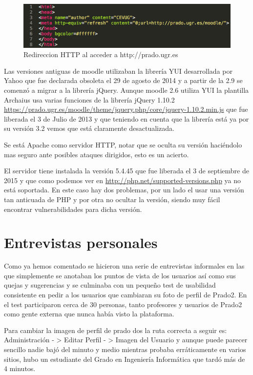\begin{figure}
\centering
\includegraphics[width=1.0\textwidth]{../screenshots/redireccionhttp}
\caption{Redireccion HTTP al acceder a http://prado.ugr.es}
\label{redireccionhttp}
\end{figure}


Las versiones antiguas de moodle utilizaban la librería YUI desarrollada por Yahoo que fue declarada obsoleta el 29 de agosto de 2014 \cite{art_01} y a partir de la 2.9 se comenzó a migrar a la librería jQuery. Aunque moodle 2.6 utiliza YUI la plantilla Archaius usa varias funciones de la librería jQuery 1.10.2 \url{https://prado.ugr.es/moodle/theme/jquery.php/core/jquery-1.10.2.min.js} que fue liberada el 3 de Julio de 2013 y que teniendo en cuenta que la librería está ya por su versión 3.2 vemos que está claramente desactualizada.

Se está Apache como servidor HTTP, notar que se oculta su versión haciéndolo mas seguro ante posibles ataques dirigidos, esto es un acierto.

El servidor tiene instalada la versión 5.4.45 que fue liberada el 3 de septiembre de 2015 y que como podemos ver en \url{http://php.net/supported-versions.php} ya no está soportada. En este caso hay dos problemas, por un lado el usar una versión tan anticuada de PHP y por otra no ocultar la versión, siendo muy fácil encontrar vulnerabilidades para dicha versión.

\section{Entrevistas personales}

Como ya hemos comentado se hicieron una serie de entrevistas informales en las que simplemente se anotaban los puntos de vista de los usuarios así como sus quejas y sugerencias y se culminaba con un pequeño test de usabilidad consistente en pedir a los usuarios que cambiaran su foto de perfil de Prado2. En el test participaron cerca de 30 personas, tanto profesores y usuarios de Prado2 como gente externa que nunca había visto la plataforma.

Para cambiar la imagen de perfil de prado dos la ruta correcta a seguir es: Administración - > Editar Perfil - > Imagen del Usuario y aunque puede parecer sencillo nadie bajó del minuto y medio mientras probaba erráticamente en varios sitios, hubo un estudiante del Grado en Ingeniería Informática que tardó más de 4 minutos.

